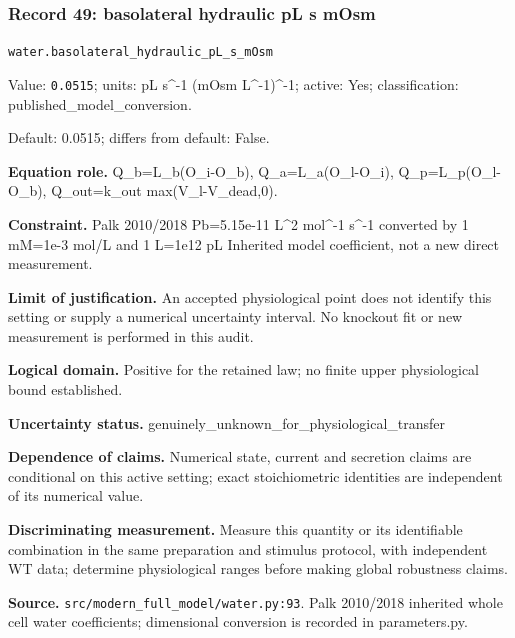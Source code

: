 \subsubsection*{Record 49: basolateral hydraulic pL s mOsm}
{\small \nolinkurl{water.basolateral_hydraulic_pL_s_mOsm}\par

Value: \texttt{0.0515}; units: pL s\textasciicircum{}-1 (mOsm L\textasciicircum{}-1)\textasciicircum{}-1; active: Yes; classification: published\_model\_conversion.\par

Default: 0.0515; differs from default: False.\par

\textbf{Equation role.} Q\_b=L\_b(O\_i-O\_b), Q\_a=L\_a(O\_l-O\_i), Q\_p=L\_p(O\_l-O\_b), Q\_out=k\_out max(V\_l-V\_dead,0).\par

\textbf{Constraint.} Palk 2010/2018 Pb=5.15e-11 L\textasciicircum{}2 mol\textasciicircum{}-1 s\textasciicircum{}-1 converted by 1 mM=1e-3 mol/L and 1 L=1e12 pL Inherited model coefficient, not a new direct measurement.\par

\textbf{Limit of justification.} An accepted physiological point does not identify this setting or supply a numerical uncertainty interval. No knockout fit or new measurement is performed in this audit.\par

\textbf{Logical domain.} Positive for the retained law; no finite upper physiological bound established.\par

\textbf{Uncertainty status.} genuinely\_unknown\_for\_physiological\_transfer\par

\textbf{Dependence of claims.} Numerical state, current and secretion claims are conditional on this active setting; exact stoichiometric identities are independent of its numerical value.\par

\textbf{Discriminating measurement.} Measure this quantity or its identifiable combination in the same preparation and stimulus protocol, with independent WT data; determine physiological ranges before making global robustness claims.\par

\textbf{Source.} \nolinkurl{src/modern_full_model/water.py:93}. Palk 2010/2018 inherited whole cell water coefficients; dimensional conversion is recorded in parameters.py.\par}

